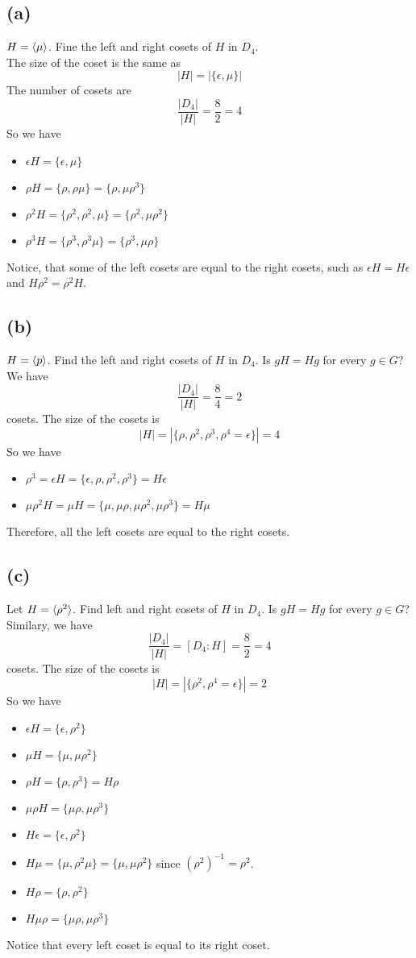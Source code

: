 \documentclass[openany]{report}
\begin{document}
\subsection{(a)}
$H = \langle \mu \rangle$. Fine the left and right cosets of $H$ in $D_4$. \\[2ex]
The size of the coset is the same as 
\[|H| = |\{\epsilon, \mu\}|\] 
The number of cosets are 
\[\frac{|D_4|}{|H|} = \frac{8}{2} = 4\]
So we have 
\begin{itemize}
    \item $\epsilon H = \{\epsilon, \mu\}$
    \item $\rho H = \{\rho, \rho\mu\} = \{\rho, \mu\rho^3\}$
    \item $\rho^2H = \{\rho^2, \rho^2,\mu\} = \{\rho^2, \mu\rho^2\}$
    \item $\rho^3H = \{\rho^3,\rho^3\mu\} = \{\rho^3, \mu\rho\}$
\end{itemize}
Notice, that some of the left cosets are equal to the right cosets, such as $\epsilon H = H\epsilon$ and $H\rho^2 = \rho^2H$.
\subsection{(b)}
$H = \langle p \rangle$. Find the left and right cosets of $H$ in $D_4$. Is $gH = Hg$ for every $g \in G$?
We have 
\[\frac{|D_4|}{|H|} = \frac{8}{4} = 2\]
cosets. The size of the cosets is 
\[|H| = |\{\rho,\rho^2, \rho^3, \rho^4 = \epsilon\}| = 4\]
So we have 
\begin{itemize}
    \item $\rho^3 = \epsilon H = \{\epsilon, \rho, \rho^2, \rho^3\} = H\epsilon$
    \item $\mu\rho^2H = \mu H = \{\mu,\mu\rho,\mu\rho^2, \mu\rho^3\} = H\mu$
\end{itemize}
Therefore, all the left cosets are equal to the right cosets.
\subsection{(c)}
Let $H = \langle \rho^2 \rangle$. Find left and right cosets of $H$ in $D_4$. Is $gH = Hg$ for every $g \in G$?
Similary, we have 
\[\frac{|D_4|}{|H|} = [D_4 : H]= \frac{8}{2} = 4\]
cosets. The size of the cosets is 
\[|H| = |\{\rho^2, \rho^4 = \epsilon\}| = 2\]
So we have 
\begin{itemize}
    \item $\epsilon H = \{\epsilon, \rho^2\}$
    \item $\mu H = \{\mu, \mu\rho^2\}$
    \item $\rho H = \{\rho,\rho^3\} = H \rho$
    \item $\mu\rho H = \{\mu\rho, \mu\rho^3\}$
    \item $H\epsilon = \{\epsilon, \rho^2\}$
    \item $ H \mu = \{\mu, \rho^2\mu\} = \{\mu, \mu\rho^2\}$ since $(\rho^2)^{-1} = \rho^2$. 
    \item $H \rho = \{\rho, \rho^2\}$
    \item $H \mu\rho = \{\mu\rho, \mu\rho^3\}$
\end{itemize}
Notice that every left coset is equal to its right coset. 
\end{document}
